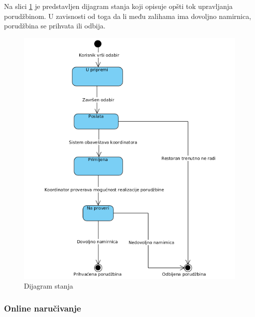 Na slici \ref{fig:slika14} je predstavljen dijagram stanja koji opisuje opšti tok upra\-vljanja porudžbinom. U zavisnosti od toga da li među zalihama ima dovoljno namirnica, porudžbina se prihvata ili odbija.
\begin{figure}[!h]
    \leavevmode
    \begin{center}
    \includegraphics[height=0.6\textheight]{slike/Upravljanje_porudzbinom.png}
    \end{center}
    \caption{Dijagram stanja} %
    \label{fig:slika14}
\end{figure}
\subsubsection{Online naručivanje}

